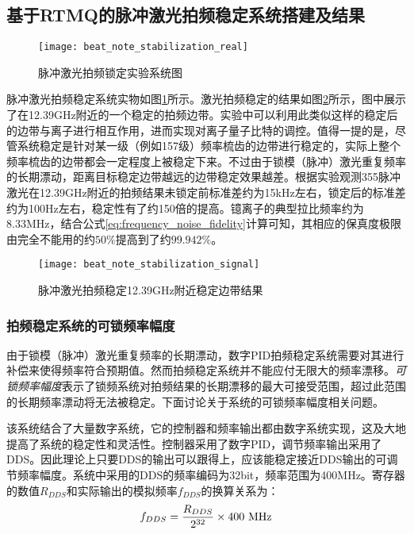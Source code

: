\subsection[基于RTMQ的脉冲激光拍频稳定系统搭建及结果]{基于RTMQ的脉冲激光拍频稳定系统搭建及结果}


\begin{figure}
    \centering
    \caption[脉冲激光拍频锁定实验系统图]{脉冲激光拍频锁定实验系统图\label{fig:beat_note_stabilization_real}}
    \texttt{[image: beat\_note\_stabilization\_real]}
\end{figure}

脉冲激光拍频稳定系统实物如图\ref{fig:beat_note_stabilization_real}所示。激光拍频稳定的结果如图\ref{fig:beat_note_stabilization_signal}所示，图中展示了在12.39GHz附近的一个稳定的拍频边带。实验中可以利用此类似这样的稳定后的边带与离子进行相互作用，进而实现对离子量子比特的调控。值得一提的是，尽管系统稳定是针对某一级（例如157级）频率梳齿的边带进行稳定的，实际上整个频率梳齿的边带都会一定程度上被稳定下来。不过由于锁模（脉冲）激光重复频率的长期漂动，距离目标稳定边带越远的边带稳定效果越差。根据实验观测355脉冲激光在12.39GHz附近的拍频结果未锁定前标准差约为15kHz左右，锁定后的标准差约为100Hz左右，稳定性有了约150倍的提高。镱离子的典型拉比频率约为8.33MHz，结合公式\eqref{eq:frequency_noise_fidelity}计算可知，其相应的保真度极限由完全不能用的约$50\%$提高到了约$99.942\%$。

\begin{figure}
    \centering
    \caption[脉冲激光拍频稳定12.39GHz附近稳定边带结果]{脉冲激光拍频稳定12.39GHz附近稳定边带结果\label{fig:beat_note_stabilization_signal}}
    \texttt{[image: beat\_note\_stabilization\_signal]}
\end{figure}

\subsubsection[拍频稳定系统的可锁频率幅度]{拍频稳定系统的可锁频率幅度}
由于锁模（脉冲）激光重复频率的长期漂动，数字PID拍频稳定系统需要对其进行补偿来使得频率符合预期值。然而拍频稳定系统并不能应付无限大的频率漂移。\emph{可锁频率幅度}表示了锁频系统对拍频结果的长期漂移的最大可接受范围，超过此范围的长期频率漂动将无法被稳定。下面讨论关于系统的可锁频率幅度相关问题。

该系统结合了大量数字系统，它的控制器和频率输出都由数字系统实现，这及大地提高了系统的稳定性和灵活性。控制器采用了数字PID，调节频率输出采用了DDS。因此理论上只要DDS的输出可以跟得上，应该能稳定接近DDS输出的可调节频率幅度。系统中采用的DDS的频率编码为32bit，频率范围为400MHz。寄存器的数值$R_{DDS}$和实际输出的模拟频率$f_{DDS}$的换算关系为：
\begin{align}
    f_{DDS}=\frac{R_{DDS}}{2^{32}}\times 400\ \textnormal{MHz}
\end{align}

